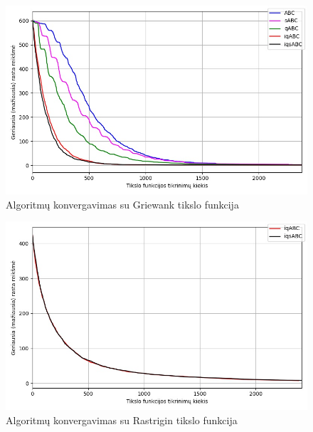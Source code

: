 \documentclass{VUMIFPSmagistrinis}
\begin{document}
\begin{landscape}
\begin{multicols}{2}
\begin{figure}[H]
    \centering
    \includegraphics[scale=0.45]{img/2kv/all_griewank.jpg}
     \caption{Algoritmų konvergavimas su Griewank tikslo funkcija}
    \label{img:vkon5a}
\end{figure}

\begin{figure}[H]
    \centering
    \includegraphics[scale=0.5]{img/2kg/rastrigin.jpg}
     \caption{Algoritmų konvergavimas su Rastrigin tikslo funkcija}
    \label{img:vkon5}
\end{figure}



\end{multicols}
\begin{multicols}{2}


\end{multicols}
\end{landscape}
\end{document}
